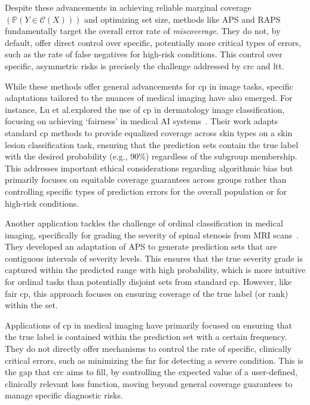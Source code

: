 Despite these advancements in achieving reliable marginal coverage
\((\mathbb{P}(Y \in \mathcal{C}(X)))\)
and optimizing set size, methods like APS and RAPS fundamentally target
the overall error rate of \emph{miscoverage}.
They do not, by default, offer direct control over
specific, potentially more critical types of errors,
such as the rate of false negatives for high-risk conditions.
This control over specific, asymmetric risks
is precisely the challenge addressed by \gls{crc} and \gls{ltt}.

While these methods offer general advancements for \gls{cp} in image tasks,
specific adaptations tailored to the nuances of medical imaging have also emerged.
For instance, Lu et al.\@ explored the use of \gls{cp} in dermatology image classification,
focusing on achieving `fairness' in medical AI systems~\cite{lu2022fair}.
Their work adapts standard \gls{cp} methods to provide equalized coverage across skin types on a
skin lesion classification task, ensuring that the prediction sets contain the
true label with the desired probability (e.g., 90\%) regardless of the subgroup
membership.  This addresses important ethical considerations regarding
algorithmic bias but primarily focuses on equitable coverage guarantees across
groups rather than controlling specific types of prediction errors for the
overall population or for high-risk conditions.

Another application tackles the challenge of ordinal classification in medical imaging,
specifically for grading the severity of spinal stenosis from MRI scans~\cite{lu2022improving}.
They developed an adaptation of APS to generate prediction sets that are
contiguous intervals of severity levels.
This ensures that the true severity grade is captured
within the predicted range with high probability,
which is more intuitive for ordinal tasks than potentially disjoint sets from standard \gls{cp}.
However, like fair \gls{cp}, this approach focuses on ensuring
coverage of the true label (or rank) within the set.

Applications of \gls{cp} in medical imaging have primarily focused on ensuring that
the true label is contained within the prediction set with a certain frequency.
They do not directly offer mechanisms to control the rate of
specific, clinically critical errors, such as
minimizing the \gls{fnr} for detecting a severe condition.
This is the gap that \gls{crc} aims to fill,
by controlling the expected value of a user-defined, clinically relevant loss function,
moving beyond general coverage guarantees to manage specific diagnostic risks.

